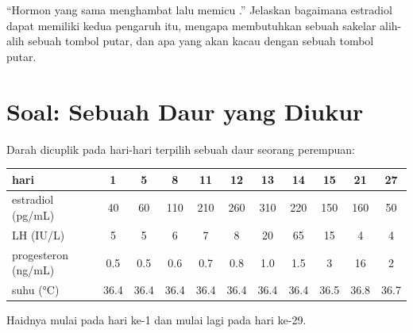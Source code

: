 \begin{exercise}[$\star\star\star$]\label{exo:b2:reproductive-hormones:12}
``Hormon yang sama menghambat lalu memicu .''
Jelaskan bagaimana estradiol dapat memiliki kedua pengaruh itu, mengapa
 membutuhkan sebuah sakelar alih-alih sebuah tombol putar, dan
apa yang akan kacau dengan sebuah tombol putar.
\end{exercise}

\section{Soal: Sebuah Daur yang Diukur}

\begin{problem}
\label{pb:b2:reproductive-hormones:1}
Darah dicuplik pada hari-hari terpilih sebuah daur seorang perempuan:

\begin{center}
\small
\begin{tabular}{lcccccccccc}
\hline
hari & 1 & 5 & 8 & 11 & 12 & 13 & 14 & 15 & 21 & 27 \\
\hline
estradiol (\unit{pg/mL}) & 40 & 60 & 110 & 210 & 260 & 310 & 220 & 150 & 160 & 50 \\
LH (\unit{IU/L}) & 5 & 5 & 6 & 7 & 8 & 20 & 65 & 15 & 4 & 4 \\
progesteron (\unit{ng/mL}) & 0.5 & 0.5 & 0.6 & 0.7 & 0.8 & 1.0 & 1.5 & 3 & 16 & 2 \\
suhu (\unit{\celsius}) & 36.4 & 36.4 & 36.4 & 36.4 & 36.4 & 36.4 & 36.4 & 36.5 & 36.8 & 36.7 \\
\hline
\end{tabular}
\end{center}

Haidnya mulai pada hari ke-1 dan mulai lagi pada hari ke-29.


\end{problem}
